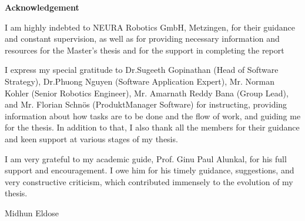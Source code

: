 \documentclass[12pt]{article}
\begin{document}
\newpage
\tableofcontents
\newpage
\listoffigures
{}
\newpage
\listoftables
{}
\newpage
\raggedright
\newpage
\raggedright
{}
\begin{center}
    \textbf{Acknowledgement}
\end{center}
    \raggedright

    I am highly indebted to NEURA Robotics GmbH, Metzingen, for their guidance and constant supervision, as well as for providing necessary information and resources for the Master's thesis and for the support in completing the report

    \vspace{1cm}
    
    I express my special gratitude to Dr.Sugeeth Gopinathan (Head of Software Strategy), Dr.Phuong Nguyen (Software Application Expert), Mr. Norman Kohler (Senior Robotics Engineer), Mr. Amarnath Reddy Bana (Group Lead), and Mr. Florian Schnös (ProduktManager Software) for instructing, providing information about how tasks are to be done and the flow of work, and guiding me for the thesis. In addition to that, I also thank all the members for their guidance and keen support at various stages of my thesis.

    \vspace{1cm}

    I am very grateful to my academic guide, Prof. Ginu Paul Alunkal, for his full support and encouragement. I owe him for his timely guidance, suggestions, and very constructive criticism, which contributed immensely to the evolution of my thesis.
    
    \vspace{1.5 cm}
    
    \raggedleft
    Midhun Eldose
\end{document}
